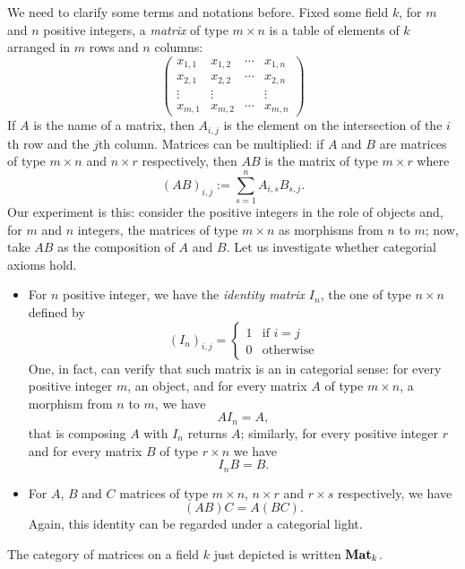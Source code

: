 \begin{example}[Matrices]
We need to clarify some terms and notations before. Fixed some field \(k\), for \(m\) and \(n\) positive integers, a {\em matrix} of type \(m \times n\) is a table of elements of \(k\) arranged in \(m\) rows and \(n\) columns:
\[\begin{pmatrix}
x_{1,1} & x_{1,2} & \cdots{} & x_{1,n} \\
x_{2,1} & x_{2,2} & \cdots{} & x_{2,n} \\
\vdots  & \vdots  &          & \vdots  \\
x_{m,1} & x_{m,2} & \cdots{} & x_{m,n}
\end{pmatrix}\]
If \(A\) is the name of a matrix, then \(A_{i, j}\) is the element on the intersection of the \(i\)th row and the \(j\)th column. Matrices can be multiplied: if \(A\) and \(B\) are matrices of type \(m \times n\) and \(n \times r\) respectively, then \(AB\) is the matrix of type \(m \times r\) where
\[(AB)_{i, j} := \sum_{s = 1}^n A_{i, s} B_{s ,j} .\]
Our experiment is this: consider the positive integers in the role of objects and, for \(m\) and \(n\) integers, the matrices of type \(m \times n\) as morphisms from \(n\) to \(m\); now, take \(AB\) as the composition of \(A\) and \(B\). Let us investigate whether categorial axioms hold.
\begin{itemize}
\item For \(n\) positive integer, we have the {\em identity matrix} \(I_n\), the one of type \(n \times n\) defined by
\[(I_n)_{i, j} = \begin{cases}
1 & \text{if } i = j \\
0 & \text{otherwise}
\end{cases}\]
One, in fact, can verify that such matrix is an  in categorial sense: for every positive integer \(m\), an object, and for every matrix \(A\) of type \(m \times n\), a morphism from \(n\) to \(m\), we have
\[A I_n = A ,\]
that is composing \(A\) with \(I_n\) returns \(A\); similarly, for every positive integer \(r\) and for every matrix \(B\) of type \(r \times n\) we have
\[I_n B = B .\]
\item For \(A\), \(B\) and \(C\) matrices of type \(m \times n\), \(n \times r\) and \(r \times s\) respectively, we have
\[(AB)C = A(BC) .\]
Again, this identity can be regarded under a categorial light.
\end{itemize}
The category of matrices on a field \(k\) just depicted is written \(\mathbf{Mat}_k\).
\end{example}

\begin{example}
\end{example}